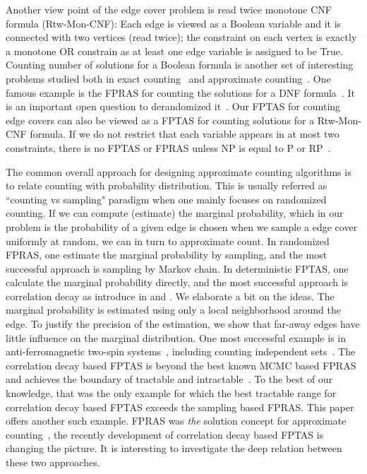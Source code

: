 Another view point of the edge cover problem is read twice monotone CNF formula (Rtw-Mon-CNF): Each edge is viewed as a Boolean variable and it is connected with two vertices (read twice); the constraint on each vertex is exactly a monotone OR constrain as at least one edge variable is assigned to be True. Counting number of solutions for a Boolean formula is another set of interesting problems studied both in exact counting~\cite{} and approximate counting~\cite{}. One famous example is the FPRAS for counting the solutions for a  DNF formula~\cite{}. It is an important open question to derandomized it~\cite{}. Our FPTAS for counting edge covers can also be viewed as a FPTAS for counting solutions for a  Rtw-Mon-CNF formula. If we do not restrict that each variable appears in at most two constraints, there is no FPTAS or FPRAS unless NP is equal to P or RP~\cite{}.

The common overall approach for designing approximate counting algorithms is to relate counting with probability distribution. 
 This is usually referred as ``counting vs sampling" paradigm when one mainly focuses on randomized counting.  If we can compute (estimate) the marginal probability, which in our problem is the probability of a given edge is chosen when we sample a edge cover uniformly at random, we can in turn to approximate count. In randomized FPRAS, one estimate the marginal probability by sampling, and the most successful approach is sampling by Markov chain.
In deterministic FPTAS, one calculate the marginal probability directly, and the most successful approach is correlation decay as introduce in \cite{BG08} and \cite{Weitz06}. We elaborate a bit on the ideas.
 The marginal probability is estimated using only a local neighborhood around the edge. To justify the precision of the estimation, we show that far-away edges have little influence on the marginal distribution.
One most successful example is in anti-ferromagnetic two-spin systems~\cite{}, including counting independent sets~\cite{Weitz06}. The correlation decay based FPTAS is beyond the best known MCMC based FPRAS and achieves the boundary of tractable and intractable~\cite{}.
To the best of our knowledge, that was the only example for which the best tractable range for correlation decay based FPTAS exceeds the sampling based FPRAS. This paper offers another such example. FPRAS was \emph{the} solution concept for approximate counting~\cite{}, the recently development of correlation decay based FPTAS is changing the picture. It is interesting to investigate the deep relation between these two approaches.

